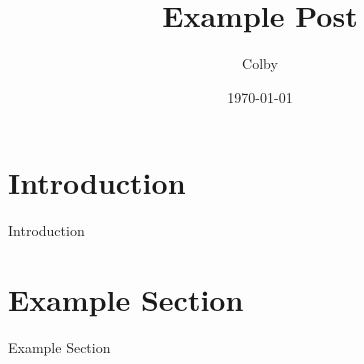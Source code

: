 \documentclass{article}
\title{Example Post}
\author{Colby}
\date{\today}
\begin{document}
\maketitle

\section{Introduction}
Introduction

\section{Example Section}
Example Section
\end{document}
